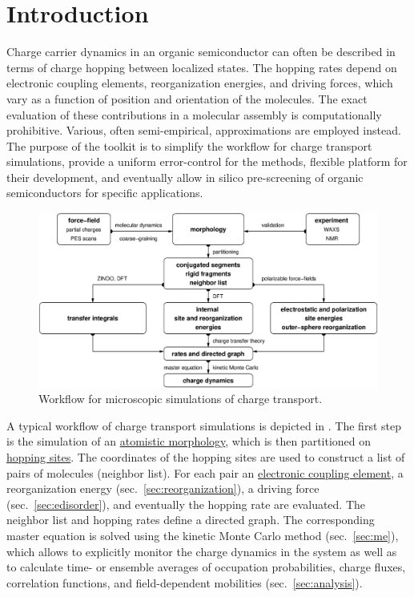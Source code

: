 \chapter{Introduction}
\label{sec:introduction}

Charge carrier dynamics in an organic semiconductor can often be described in terms of charge hopping between localized states. The hopping rates depend on electronic coupling elements, reorganization energies, and driving forces, which vary as a function of position and orientation of the molecules.  The exact evaluation of these contributions in a molecular assembly is computationally prohibitive. Various, often semi-empirical, approximations are employed instead. The purpose of the toolkit is to simplify the workflow for charge transport simulations, provide a uniform error-control for the methods, flexible platform for their development, and eventually allow in silico pre-screening of organic semiconductors for specific applications. 

\begin{figure}[t]
\includegraphics[width=\linewidth]{fig/workflow/workflow}
 \caption{%
   Workflow for microscopic simulations of charge transport.  %
   \label{fig:workflow}}
\end{figure}

A typical workflow of charge transport simulations is depicted in . The first step is the simulation of an \hyperref[sec:morphology]{atomistic morphology}, which is then partitioned on \hyperref[sec:mapping]{hopping sites}. The coordinates of the hopping sites are used to construct a list of pairs of molecules (neighbor list). For each pair an \hyperref[sec:transfer_integrals]{electronic coupling element}, a reorganization energy (sec.~\ref{sec:reorganization}), a driving force (sec.~\ref{sec:edisorder}), and eventually the hopping rate are evaluated. The neighbor list and hopping rates define a directed graph. The corresponding master equation is solved using the kinetic Monte Carlo method (sec.~\ref{sec:me}), which allows to explicitly monitor the charge dynamics in the system as well as to calculate time- or ensemble averages of occupation probabilities, charge fluxes, correlation functions, and field-dependent mobilities (sec.~\ref{sec:analysis}).


